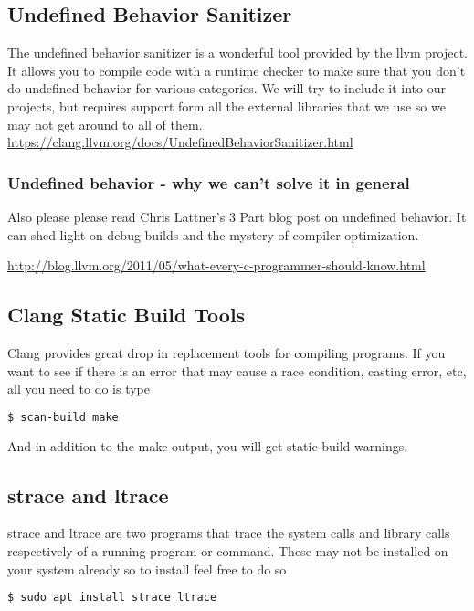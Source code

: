 \subsection{Undefined Behavior Sanitizer}

The undefined behavior sanitizer is a wonderful tool provided by the llvm project.
It allows you to compile code with a runtime checker to make sure that you don't do undefined behavior for various categories.
We will try to include it into our projects, but requires support form all the external libraries that we use so we may not get around to all of them.
\url{https://clang.llvm.org/docs/UndefinedBehaviorSanitizer.html}

\subsubsection{Undefined behavior - why we can't solve it in general}

Also please please read Chris Lattner's 3 Part blog post on undefined behavior. It can shed light on debug builds and the mystery of compiler optimization.

\url{http://blog.llvm.org/2011/05/what-every-c-programmer-should-know.html}


\subsection{Clang Static Build Tools}

Clang provides great drop in replacement tools for compiling programs. If you want to see if there is an error that may cause a race condition, casting error, etc, all you need to do is type

\begin{lstlisting}[language=bash]
$ scan-build make
\end{lstlisting}

And in addition to the make output, you will get static build warnings.

\subsection{strace and ltrace}

strace and ltrace are two programs that trace the system calls and library calls respectively of a running program or command.
These may not be installed on your system already so to install feel free to do so

\begin{lstlisting}[language=bash]
$ sudo apt install strace ltrace
\end{lstlisting}

